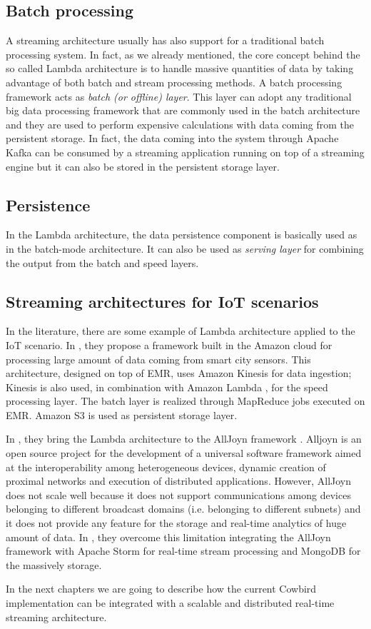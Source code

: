 \subsection{Batch processing}
A streaming architecture usually has also support for a traditional batch processing system. In fact, as we already mentioned, the core concept behind the so called Lambda architecture is to handle massive quantities of data by taking advantage of both batch and stream processing methods. A batch processing framework acts as \emph{batch (or offline) layer}. This layer can adopt any traditional big data processing framework that are commonly used in the batch architecture and they are used to perform expensive calculations with data coming from the persistent storage. In fact, the data coming into the system through Apache Kafka can be consumed by a streaming application running on top of a streaming engine but it can also be stored in the persistent storage layer.


\subsection{Persistence}
In the Lambda architecture, the data persistence component is basically used as in the batch-mode architecture. It can also be used as \emph{serving layer} for combining the output from the batch and speed layers.


\subsection{Streaming architectures for IoT scenarios}
In the literature, there are some example of Lambda architecture applied to the IoT scenario. In \cite{lambdaarchitecturecosteffective}, they propose a framework built in the Amazon cloud for processing large amount of data coming from smart city sensors. This architecture, designed on top of EMR, uses Amazon Kinesis \cite{amazonkinesisonline} for data ingestion; Kinesis is also used, in combination with Amazon Lambda \cite{amazonlambdaonline}, for the speed processing layer. The batch layer is realized through MapReduce jobs executed on EMR. Amazon S3 is used as persistent storage layer. 

In \cite{alljoynlambda}, they bring the Lambda architecture to the  AllJoyn framework \cite{alljoynframeworkonline}. Alljoyn is an open source project for the development of a universal software framework aimed at the interoperability among heterogeneous devices, dynamic creation of proximal networks and execution of distributed applications. However, AllJoyn does not scale well because it does not support communications among devices belonging to different broadcast domains (i.e. belonging to different subnets) and it does not provide any feature for the storage and real-time analytics of huge amount of data. In \cite{alljoynlambda}, they overcome this limitation integrating the AllJoyn framework with Apache Storm for real-time stream processing and MongoDB for the massively storage.

In the next chapters we are going to describe how the current Cowbird implementation can be integrated with a scalable and distributed real-time streaming architecture.









